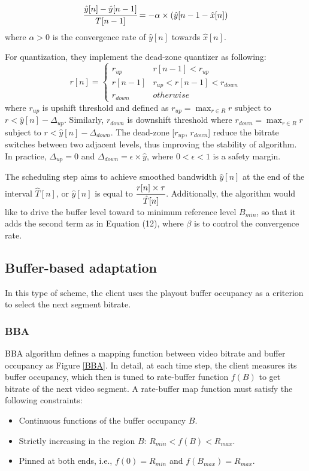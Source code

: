 \documentclass[journal]{IEEEtran}
\begin{document}
\begin{equation}
\cfrac{\hat{y}[n]-\hat{y}[n-1]}{T[n-1]}=-\alpha\times(\hat{y}[n-1-\hat{x}[n])
\label{PANDA smooth}
\end{equation}
where $\alpha > 0$ is the
convergence rate of $\hat{y}[n]$ towards $\hat{x}[n]$.
\par For quantization, they implement the dead-zone quantizer as following:
\begin{equation}
r[n]=\begin{cases}
r_{up} & r[n-1]<r_{up}\\
r[n-1] & r_{up}<r[n-1]<r_{down}\\
r_{down} & otherwise
\end{cases}
\end{equation}
where $r_{up}$ is upshift threshold and defined as $r_{up}=\max_{r\in R}r$ subject to $r<\hat{y}[n]-\Delta_{up}$. Similarly, $r_{down}$ is downshift threshold where $r_{down}=\max_{r\in R}r$ subject to $r<\hat{y}[n]-\Delta_{down}$. The dead-zone [$r_{up}$, $r_{down}$] reduce the bitrate switches between two adjacent levels, thus improving the stability of algorithm. In practice, $\Delta_{up}=0$ and $\Delta_{down}=\epsilon\times\hat{y}$, where $0<\epsilon<1$ is a safety margin.
\par The scheduling step aims to achieve smoothed bandwidth $\hat{y}[n]$ at the end of the interval $\hat{T}[n]$, or $\hat{y}[n]$ is equal to $\cfrac{r[n]\times\tau}{\hat{T}[n]}$. Additionally, the algorithm would like to drive the buffer level toward to minimum reference level $B_{min}$, so that it adds the second term as in Equation (12), where $\beta$ is to control the convergence rate.
\subsection{Buffer-based adaptation}
In this type of
scheme, the client uses the playout buffer occupancy as
a criterion to select the next segment bitrate.
\subsubsection{BBA}
BBA algorithm \cite{BBA} defines a mapping function between video bitrate and buffer occupancy as Figure \ref{BBA}. In detail, at each time step, the client measures its buffer occupancy, which then is tuned to rate-buffer function $f(B)$ to get bitrate of the next video segment. A rate-buffer map function must satisfy the following constraints:
\begin{itemize}
    \item Continuous functions of the buffer occupancy $B$.
    \item Strictly increasing in the region $B$:  $R_{min} < f(B) < R_{max}$.
    \item Pinned at both ends, i.e., $f(0) = R_{min}$ and $f(B_{max}) = R_{max}$.


\end{itemize}
\end{document}
